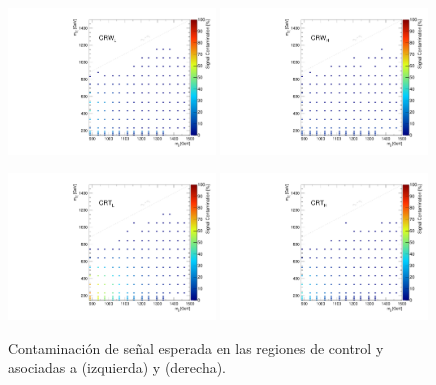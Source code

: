\begin{figure}[!htbp]
  \centering
  \includegraphics[width=0.49\textwidth]{figures/signal_contamination_crwl}
  \includegraphics[width=0.49\textwidth]{figures/signal_contamination_crwh}

  \includegraphics[width=0.49\textwidth]{figures/signal_contamination_crtl}
  \includegraphics[width=0.49\textwidth]{figures/signal_contamination_crth}

  \caption{Contaminación de señal esperada en las regiones de control {\CRW} y {\CRT} asociadas a {\SRL} (izquierda) y {\SRH} (derecha).}
  \label{fig:bkg_cr_contamination}
\end{figure}



